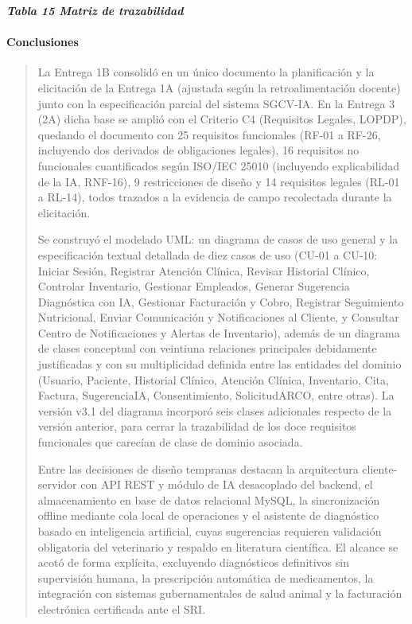 \documentclass[
]{article}
\begin{document}
\protect{}\label{_bookmark66}{}\emph{\textbf{Tabla 15
Matriz de trazabilidad}}

\paragraph{Conclusiones}\label{conclusiones}

\begin{quote}
La Entrega 1B consolidó en un único documento la planificación y la
elicitación de la Entrega 1A (ajustada según la retroalimentación
docente) junto con la especificación parcial del sistema SGCV-IA. En la
Entrega 3 (2A) dicha base se amplió con el Criterio C4 (Requisitos
Legales, LOPDP), quedando el documento con 25 requisitos funcionales
(RF-01 a RF-26, incluyendo dos derivados de obligaciones legales), 16
requisitos no funcionales cuantificados según ISO/IEC 25010 (incluyendo
explicabilidad de la IA, RNF-16), 9 restricciones de diseño y 14
requisitos legales (RL-01 a RL-14), todos trazados a la evidencia de
campo recolectada durante la elicitación.

Se construyó el modelado UML: un diagrama de casos de uso general y la
especificación textual detallada de diez casos de uso (CU-01 a CU-10:
Iniciar Sesión, Registrar Atención Clínica, Revisar Historial Clínico,
Controlar Inventario, Gestionar Empleados, Generar Sugerencia
Diagnóstica con IA, Gestionar Facturación y Cobro, Registrar Seguimiento
Nutricional, Enviar Comunicación y Notificaciones al Cliente, y
Consultar Centro de Notificaciones y Alertas de Inventario), además de
un diagrama de clases conceptual con veintiuna relaciones principales
debidamente justificadas y con su multiplicidad definida entre las
entidades del dominio (Usuario, Paciente, Historial Clínico, Atención
Clínica, Inventario, Cita, Factura, SugerenciaIA, Consentimiento,
SolicitudARCO, entre otras). La versión v3.1 del diagrama incorporó
seis clases adicionales respecto de la versión anterior, para cerrar
la trazabilidad de los doce requisitos funcionales que carecían de
clase de dominio asociada.

Entre las decisiones de diseño tempranas destacan la arquitectura
cliente-servidor con API REST y módulo de IA desacoplado del backend, el
almacenamiento en base de datos relacional MySQL, la sincronización
offline mediante cola local de operaciones y el asistente de diagnóstico
basado en inteligencia artificial, cuyas sugerencias requieren
validación obligatoria del veterinario y respaldo en literatura
científica. El alcance se acotó de forma explícita, excluyendo
diagnósticos definitivos sin supervisión humana, la prescripción
automática de medicamentos, la integración con sistemas gubernamentales
de salud animal y la facturación electrónica certificada ante el SRI.


\end{quote}
\end{document}
